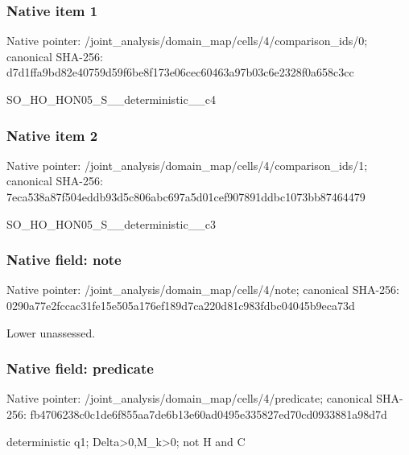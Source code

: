 \documentclass[10pt,a4paper]{article}
\begin{document}
\subsubsection{Native item 1}
Native pointer: /joint\_\allowbreak{}analysis/domain\_\allowbreak{}map/cells/4/comparison\_\allowbreak{}ids/0; canonical SHA-256: d7d1ffa9bd82e40759d59f6be8f173e06cec60463a97b03c6e2328f0a658c3cc

\begingroup\raggedright\sloppy SO\_\allowbreak{}HO\_\allowbreak{}HON05\_\allowbreak{}S\_\allowbreak{}\_\allowbreak{}deterministic\_\allowbreak{}\_\allowbreak{}c4\par\endgroup

\subsubsection{Native item 2}
Native pointer: /joint\_\allowbreak{}analysis/domain\_\allowbreak{}map/cells/4/comparison\_\allowbreak{}ids/1; canonical SHA-256: 7eca538a87f504eddb93d5c806abc697a5d01cef907891ddbc1073bb87464479

\begingroup\raggedright\sloppy SO\_\allowbreak{}HO\_\allowbreak{}HON05\_\allowbreak{}S\_\allowbreak{}\_\allowbreak{}deterministic\_\allowbreak{}\_\allowbreak{}c3\par\endgroup

\subsubsection{Native field: note}
Native pointer: /joint\_\allowbreak{}analysis/domain\_\allowbreak{}map/cells/4/note; canonical SHA-256: 0290a77e2fccac31fe15e505a176ef189d7ca220d81c983fdbc04045b9eca73d

\begingroup\raggedright\sloppy Lower unassessed.\par\endgroup

\subsubsection{Native field: predicate}
Native pointer: /joint\_\allowbreak{}analysis/domain\_\allowbreak{}map/cells/4/predicate; canonical SHA-256: fb4706238c0c1de6f855aa7de6b13e60ad0495e335827ed70cd0933881a98d7d

\begingroup\raggedright\sloppy deterministic q1;\allowbreak{} Delta>0,\allowbreak{}M\_\allowbreak{}k>0;\allowbreak{} not H and C\par\endgroup
\end{document}
